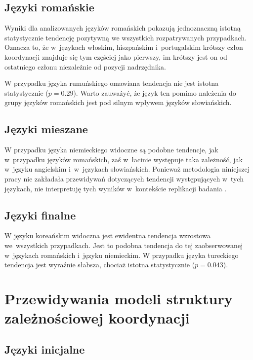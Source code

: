 \subsection{Języki romańskie}

Wyniki dla analizowanych języków romańskich pokazują jednoznaczną istotną statystycznie tendencję pozytywną we wszystkich rozpatrywanych przypadkach. Oznacza to, że w~językach włoskim, hiszpańskim i~portugalskim krótszy człon koordynacji znajduje się tym częściej jako pierwszy, im krótszy jest on od ostatniego członu niezależnie od pozycji nadrzędnika. 

W przypadku języka rumuńskiego omawiana tendencja nie jest istotna statystycznie ($p=0.29$). Warto zauważyć, że język ten pomimo należenia do grupy języków romańskich jest pod silnym wpływem języków słowiańskich.

\subsection{Języki mieszane}

W przypadku języka niemieckiego widoczne są podobne tendencje, jak w~przypadku języków romańskich, zaś w~łacinie występuje taka zależność, jak w~języku angielskim i~w~językach słowiańskich. Ponieważ metodologia niniejszej pracy nie zakładała przewidywań dotyczących tendencji występujących w~tych językach, nie interpretuję tych wyników w~kontekście replikacji badania \cite{przepiorkowski2023conjunct}.

\subsection{Języki finalne}

W języku koreańskim widoczna jest ewidentna tendencja wzrostowa we~wszystkich przypadkach. Jest to podobna tendencja do tej zaobserwowanej w~językach romańskich i~języku niemieckim. W przypadku języka tureckiego tendencja jest wyraźnie słabsza, chociaż istotna statystycznie ($p=0.043$).

\section{Przewidywania modeli struktury zależnościowej koordynacji}

\subsection{Języki inicjalne}

